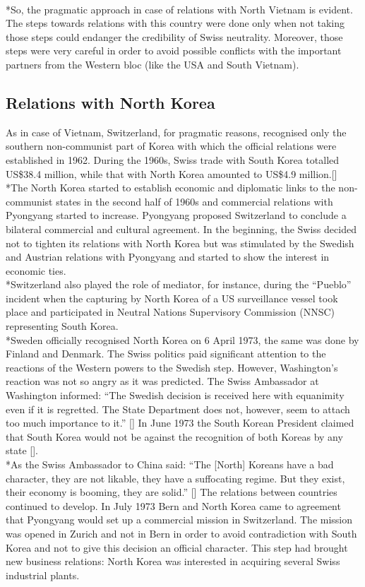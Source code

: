\documentclass[a4paper]{article}
\begin{document}
\\*So, the pragmatic approach in case of relations with North Vietnam is evident. The steps towards relations with this country were done only when not taking those steps could endanger the credibility of Swiss neutrality. Moreover, those steps were very careful in order to avoid possible conflicts with the important partners from the Western bloc (like the USA and South Vietnam).
\subsection{Relations with North Korea}
As in case of Vietnam, Switzerland, for pragmatic reasons, recognised only the southern non-communist part of Korea with which the official relations were established in 1962. During the 1960s, Swiss trade with South Korea totalled US\$38.4 million, while that with North Korea amounted to US\$4.9 million.[]
\\*The North Korea started to establish economic and diplomatic links to the non-communist states in the second half of 1960s and commercial relations with Pyongyang started to increase. Pyongyang proposed Switzerland to conclude a bilateral commercial and cultural agreement. In the beginning, the Swiss decided not to tighten its relations with North Korea but was stimulated by the Swedish and Austrian relations with Pyongyang and started to show the interest in economic ties.
\\*Switzerland also played the role of mediator, for instance, during the “Pueblo” incident when the capturing by North Korea of a US surveillance vessel took place and participated in Neutral Nations Supervisory Commission (NNSC) representing South Korea.
\\*Sweden officially recognised North Korea on 6 April 1973, the same was done by Finland and Denmark. The Swiss politics paid significant attention to the reactions of the Western powers to the Swedish step. However, Washington’s reaction was not so angry as it was predicted. The Swiss Ambassador at Washington informed: “The Swedish decision is received here with equanimity even if it is regretted. The State Department does not, however, seem to attach too much importance to it.” [] In June 1973 the South Korean President claimed that South Korea would not be against the recognition of both Koreas by any state [].
\\*As the Swiss Ambassador to China said: “The [North] Koreans have a bad character, they are not likable, they have a suffocating regime. But they exist, their economy is booming, they are solid.” [] The relations between countries continued to develop. In July 1973 Bern and North Korea came to agreement that Pyongyang would set up a commercial mission in Switzerland. The mission was opened in Zurich and not in Bern in order to avoid contradiction with South Korea and not to give this decision an official character. This step had brought new business relations: North Korea was interested in acquiring several Swiss industrial plants. 
\end{document}
